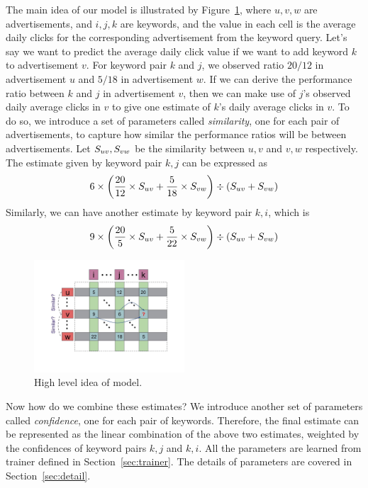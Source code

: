 The main idea of our model is illustrated by
Figure~\ref{fig:sppan-idea}, where $u,v,w$ are advertisements, and
$i,j,k$ are keywords, and the value in each cell is the average daily
clicks for the corresponding advertisement from the keyword query.
Let's say we want to predict the average daily click value if we want
to add keyword $k$ to advertisement $v$. For keyword pair $k$ and $j$,
we observed ratio $20/12$ in advertisement $u$ and $5/18$ in
advertisement $w$. If we can derive the performance ratio between $k$
and $j$ in advertisement $v$, then we can make use of $j$'s observed
daily average clicks in $v$ to give one estimate of $k$'s daily
average clicks in $v$. To do so, we introduce a set of parameters
called {\em similarity}, one for each pair of advertisements, to
capture how similar the performance ratios will be between
advertisements. Let $S_{{u}{v}},S_{{v}{w}}$ be the
similarity between $u,v$ and $v,w$ respectively. The estimate given by
keyword pair $k,j$ can be expressed as
\[ 6\times \left(\frac{20}{12}\times S_{{u}{v}} + \frac{5}{18}\times S_{{v}{w}} \right)\div \left(S_{{u}{v}} + S_{{v}{w}} \right) \]
Similarly, we can have another estimate by keyword pair $k,i$, which is
\[ 9\times \left(\frac{20}{5}\times S_{{u}{v}} + \frac{5}{22}\times S_{{v}{w}} \right)\div \left(S_{{u}{v}} + S_{{v}{w}} \right) \]

\begin{figure}[!ht]
  \centering
  \includegraphics[width=0.5\textwidth]{figures/example.jpg}
  \caption{High level idea of {\sppan} model.}
  \label{fig:sppan-idea}
\end{figure}

Now how do we combine these estimates? We introduce another set of
parameters called {\em confidence}, one for each pair of
keywords. Therefore, the final estimate can be represented as the
linear combination of the above two estimates, weighted by the
confidences of keyword pairs $k,j$ and $k,i$. All the parameters are
learned from {\sppan} trainer defined in Section~\ref{sec:trainer}.
The details of parameters are covered in Section~\ref{sec:detail}.
